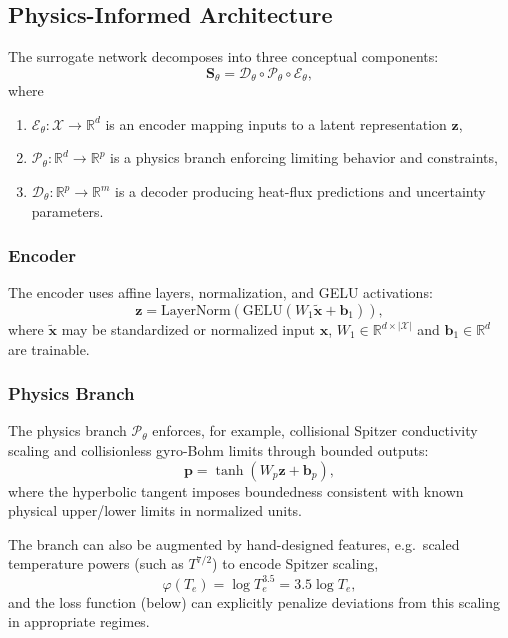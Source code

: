 \documentclass[11pt]{article}
\begin{document}
\subsection{Physics-Informed Architecture}

The surrogate network decomposes into three conceptual components:
\begin{equation}
  \bm{S}_\theta = \mathcal{D}_\theta \circ \mathcal{P}_\theta \circ \mathcal{E}_\theta,
\end{equation}
where
\begin{enumerate}[label=(\alph*)]
  \item $\mathcal{E}_\theta: \mathcal{X} \to \mathbb{R}^d$ is an encoder mapping inputs to a latent representation $\bm{z}$,
  \item $\mathcal{P}_\theta: \mathbb{R}^d \to \mathbb{R}^p$ is a physics branch enforcing limiting behavior and constraints,
  \item $\mathcal{D}_\theta: \mathbb{R}^p \to \mathbb{R}^m$ is a decoder producing heat-flux predictions and uncertainty parameters.
\end{enumerate}

\subsubsection{Encoder}

The encoder uses affine layers, normalization, and GELU activations:
\begin{equation}
  \bm{z} = \mathrm{LayerNorm}(\mathrm{GELU}(W_1 \tilde{\bm{x}} + \bm{b}_1)),
\end{equation}
where $\tilde{\bm{x}}$ may be standardized or normalized input $\bm{x}$, $W_1 \in \mathbb{R}^{d \times |\mathcal{X}|}$ and $\bm{b}_1 \in \mathbb{R}^d$ are trainable.

\subsubsection{Physics Branch}

The physics branch $\mathcal{P}_\theta$ enforces, for example, collisional Spitzer conductivity scaling and collisionless gyro-Bohm limits through bounded outputs:
\begin{equation}
  \bm{p} = \tanh(W_p \bm{z} + \bm{b}_p),
\end{equation}
where the hyperbolic tangent imposes boundedness consistent with known physical upper/lower limits in normalized units.

The branch can also be augmented by hand-designed features, e.g.\ scaled temperature powers (such as $T^{7/2}$) to encode Spitzer scaling,
\begin{equation}
  \varphi(T_e) = \log T_e^{3.5} = 3.5 \log T_e,
\end{equation}
and the loss function (below) can explicitly penalize deviations from this scaling in appropriate regimes.
\end{document}
